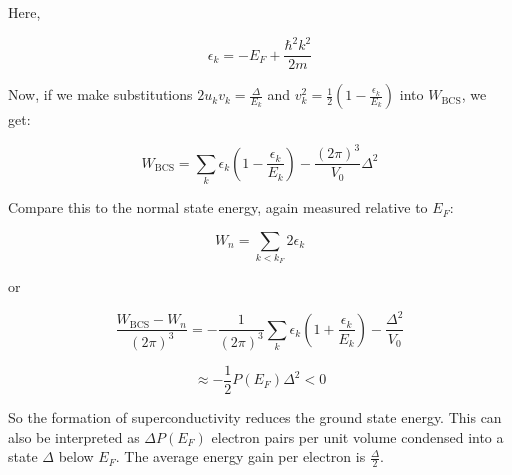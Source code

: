 \documentclass{article}
\begin{document}
Here,

\[
\epsilon_k = -E_F + \frac{\hbar^2 k^2}{2m}
\]

Now, if we make substitutions \( 2u_k v_k = \frac{\Delta}{E_k} \) and \( v_k^2 = \frac{1}{2} \left( 1 - \frac{\epsilon_k}{E_k} \right) \) into \( W_{\text{BCS}} \), we get:

\[
W_{\text{BCS}} = \sum_k \epsilon_k \left( 1 - \frac{\epsilon_k}{E_k} \right) - \frac{(2\pi)^3}{V_0} \Delta^2
\]

Compare this to the normal state energy, again measured relative to \( E_F \):

\[
W_n = \sum_{k < k_F} 2\epsilon_k
\]

or

\[
\frac{W_{\text{BCS}} - W_n}{(2\pi)^3} = - \frac{1}{(2\pi)^3} \sum_k \epsilon_k \left( 1 + \frac{\epsilon_k}{E_k} \right) - \frac{\Delta^2}{V_0}
\]

\[
\approx - \frac{1}{2} P(E_F) \Delta^2 < 0
\]

So the formation of superconductivity reduces the ground state energy. This can also be interpreted as \( \Delta P(E_F) \) electron pairs per unit volume condensed into a state \( \Delta \) below \( E_F \). The average energy gain per electron is \( \frac{\Delta}{2} \).
\end{document}
